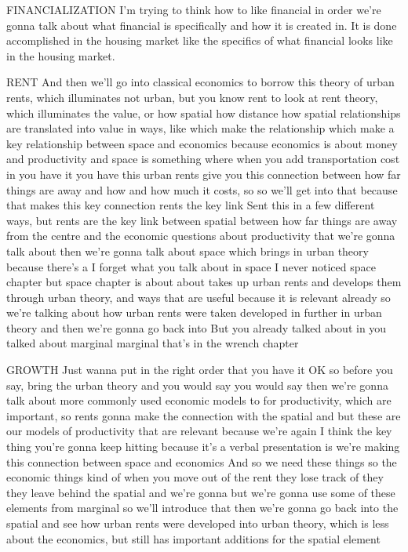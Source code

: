 FINANCIALIZATION
I’m trying to think how to like financial in order we’re gonna talk about what financial is specifically and how it is created in. It is done accomplished in the housing market like the specifics of what financial looks like in the housing market.

RENT
And then we’ll go into classical economics to borrow this theory of urban rents, which illuminates not urban, but you know rent to look at rent theory, which illuminates the value, or how spatial how distance how spatial relationships are translated into value in ways, like which make the relationship which make a key relationship between space and economics because economics is about money and productivity and space is something where when you add transportation cost in you have it you have this urban rents give you this connection between how far things are away and how and how much it costs, so so we’ll get into that because that makes this key connection rents the key link Sent this in a few different ways, but rents are the key link between spatial between how far things are away from the centre and the economic questions about productivity that we’re gonna talk about then we’re gonna talk about space which brings in urban theory because there’s a I forget what you talk about in space I never noticed space chapter but space chapter is about about takes up urban rents and develops them through urban theory, and ways that are useful because it is relevant already so we’re talking about how urban rents were taken developed in further in urban theory and then we’re gonna go back into But you already talked about in you talked about marginal marginal that’s in the wrench chapter

GROWTH
Just wanna put in the right order that you have it OK so before you say, bring the urban theory and you would say you would say then we’re gonna talk about more commonly used economic models to for productivity, which are important, so rents gonna make the connection with the spatial and but these are our models of productivity that are relevant because we’re again I think the key thing you’re gonna keep hitting because it’s a verbal presentation is we’re making this connection between space and economics And so we need these things so the economic things kind of when you move out of the rent they lose track of they they leave behind the spatial and we’re gonna but we’re gonna use some of these elements from marginal so we’ll introduce that then we’re gonna go back into the spatial and see how urban rents were developed into urban theory, which is less about the economics, but still has important additions for the spatial element

